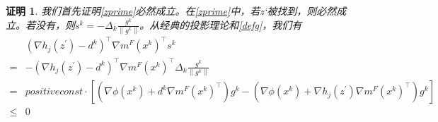 \documentclass[macfonts]{njuthesis}
\newtheorem*{Proof}{证明}
\begin{document}
\begin{Proof}
我们首先证明\ref{zprime}必然成立。在\ref{zprime}中，若z‘被找到，则必然成立。若没有，则$s^{k}=-\Delta_{k} \frac{g^{k}}{\left\|g^{k}\right\|}$。从经典的投影理论和\ref{defg}，我们有
$$
\begin{aligned}
&\left(\nabla h_{j}\left(z^{\prime}\right)-d^{k}\right)^{\top} \nabla m^F(x^{k})^{\top} s^{k}\\
=&-\left(\nabla h_{j}\left(z^{\prime}\right)-d^{k}\right)^{\top} \nabla m^F(x^{k})^{\top} \Delta_{k} \frac{g^{k}}{\left\|g^{k}\right\|} \\
=&positiveconst\cdot\left[\left(\nabla\phi(x^k)+d^{k} \nabla m^F(x^{k})^{\top}\right) g^k-\left(\nabla\phi(x^k)+\nabla h_{j}\left(z^{\prime}\right) \nabla m^F(x^{k})^{\top}\right) g^k\right]\\
\leq&0
\end{aligned}
$$


\end{Proof}
\end{document}
